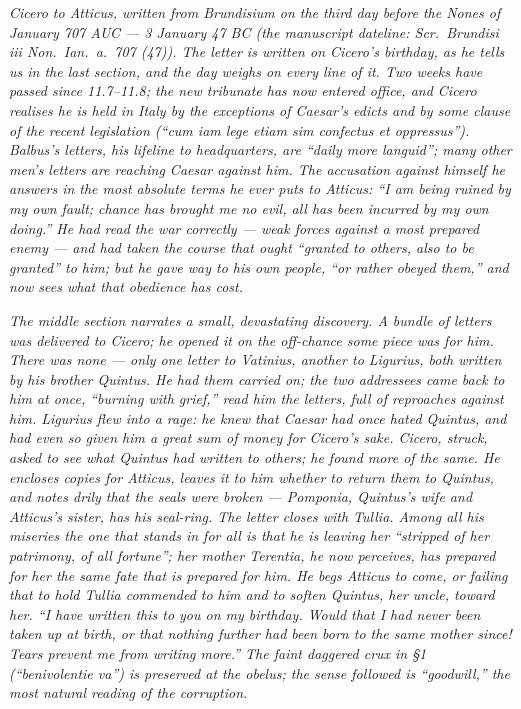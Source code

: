 
\textit{Cicero to Atticus, written from Brundisium on
the third day before the Nones of January 707 AUC ---
3 January 47 BC (the manuscript dateline: \textit{Scr.\
Brundisi iii Non.\ Ian.\ a.\ 707 (47)}). The letter is
written on Cicero's birthday, as he tells us in the
last section, and the day weighs on every line of it.
Two weeks have passed since 11.7--11.8; the new
tribunate has now entered office, and Cicero realises
he is held in Italy by the exceptions of Caesar's
edicts and by some clause of the recent legislation
(``cum iam lege etiam sim confectus et oppressus'').
Balbus's letters, his lifeline to headquarters, are
``daily more languid''; many other men's letters are
reaching Caesar against him. The accusation against
himself he answers in the most absolute terms he ever
puts to Atticus: ``I am being ruined by my own
fault; chance has brought me no evil, all has been
incurred by my own doing.'' He had read the war
correctly --- weak forces against a most prepared
enemy --- and had taken the course that ought
``granted to others, also to be granted'' to him; but
he gave way to his own people, ``or rather obeyed
them,'' and now sees what that obedience has cost.}

\textit{The middle section narrates a small,
devastating discovery. A bundle of letters was
delivered to Cicero; he opened it on the off-chance
some piece was for him. There was none --- only one
letter to Vatinius, another to Ligurius, both written
by his brother Quintus. He had them carried on; the
two addressees came back to him at once, ``burning
with grief,'' read him the letters, full of reproaches
against him. Ligurius flew into a rage: he knew that
Caesar had once hated Quintus, and had even so given
him a great sum of money for Cicero's sake. Cicero,
struck, asked to see what Quintus had written to
others; he found more of the same. He encloses
copies for Atticus, leaves it to him whether to
return them to Quintus, and notes drily that the
seals were broken --- Pomponia, Quintus's wife and
Atticus's sister, has his seal-ring. The letter
closes with Tullia. Among all his miseries the one
that stands in for all is that he is leaving her
``stripped of her patrimony, of all fortune''; her
mother Terentia, he now perceives, has prepared for
her the same fate that is prepared for him. He begs
Atticus to come, or failing that to hold Tullia
commended to him and to soften Quintus, her uncle,
toward her. ``I have written this to you on my
birthday. Would that I had never been taken up at
birth, or that nothing further had been born to the
same mother since! Tears prevent me from writing
more.'' The faint daggered crux in \S1 (``benivolentie
va\dag'') is preserved at the obelus; the sense
followed is ``goodwill,'' the most natural reading of
the corruption.}
